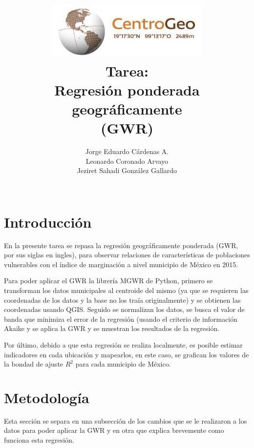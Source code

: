 \documentclass[12pt,letterpaper]{article}
\author{
Jorge Eduardo Cárdenas A.\\
Leonardo Coronado Arvayo\\
Jeziret Sahadi González Gallardo\\
{\small }\\
\vspace*{2.25in}}
\title{	\includegraphics[width=8cm]{Logo} \\
\vspace*{.25in}
Tarea: \\ Regresión ponderada geográficamente \\
(GWR) \\
\vspace*{1.0in}}
\begin{document}
	\maketitle
\newpage
	\tableofcontents
\pagebreak





\section{Introducción}

En la presente tarea se repasa la regresión geográficamente ponderada (GWR, por sus siglas en ingles), para observar relaciones de características de poblaciones vulnerables con el índice de marginación a nivel municipio de México en 2015.

Para poder aplicar el GWR la librería MGWR de Python, primero se transforman los datos municipales al centroide del mismo (ya que se requieren las coordenadas de los datos y la base no los traía originalmente) y se obtienen las coordenadas usando QGIS. Seguido se normalizan los datos, se busca el valor de banda que minimiza el error de la regresión (usando el criterio de información Akaike y se aplica la GWR y se muestran los resultados de la regresión.

Por último, debido a que esta regresión se realiza localmente, es posible estimar indicadores en cada ubicación y mapearlos, en este caso, se grafican los valores de la bondad de ajuste $R^2$ para cada municipio de México.

\section{Metodología}

Esta sección se separa en una subsección de los cambios que se le realizaron a los datos para poder aplicar la GWR y en otra que explica brevemente como funciona esta regresión.
\end{document}
